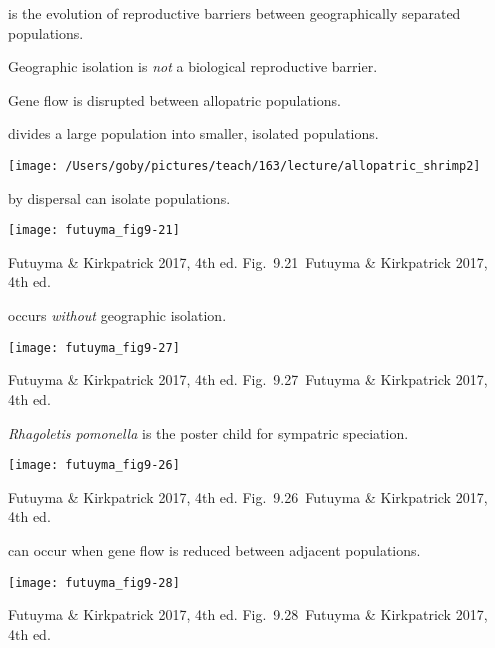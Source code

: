 \documentclass[t]{beamer}
\newcommand{\futuyma}[1]{%
	\ifthenelse{\isempty{#1}}%
	{Futuyma \& Kirkpatrick 2017, 4th ed.}%
	{Fig.~#1~Futuyma \& Kirkpatrick 2017, 4th ed.}%
}
\newcommand{\backskip}{\vspace{-0.5\baselineskip}}
\begin{document}

\begin{frame}{ is the evolution of reproductive barriers between geographically separated populations.}

\hangpara Geographic isolation is \emph{not} a biological reproductive barrier.

\hangpara Gene flow is disrupted between allopatric populations.

\end{frame}


\begin{frame}{ divides a large population into smaller, isolated populations.}

\vspace{-\baselineskip}

\centering

\texttt{[image: /Users/goby/pictures/teach/163/lecture/allopatric\_shrimp2]}

\end{frame}


\begin{frame}{ by dispersal can isolate populations.}

\backskip

\centering

\texttt{[image: futuyma\_fig9-21]}

\tinyfill \futuyma{9.21}
\end{frame}


\begin{frame}{ occurs \emph{without} geographic isolation.}

\backskip

\centering

\texttt{[image: futuyma\_fig9-27]}

\tinyfill \futuyma{9.27}

\end{frame}


\begin{frame}{\textit{Rhagoletis pomonella} is the poster child for sympatric speciation.}

\backskip

\texttt{[image: futuyma\_fig9-26]}

\tinyfill \futuyma{9.26}

\end{frame}


\begin{frame}{ can occur when gene flow is reduced between adjacent populations.}

\backskip

\texttt{[image: futuyma\_fig9-28]}

\tinyfill \futuyma{9.28}

\end{frame}
\end{document}
